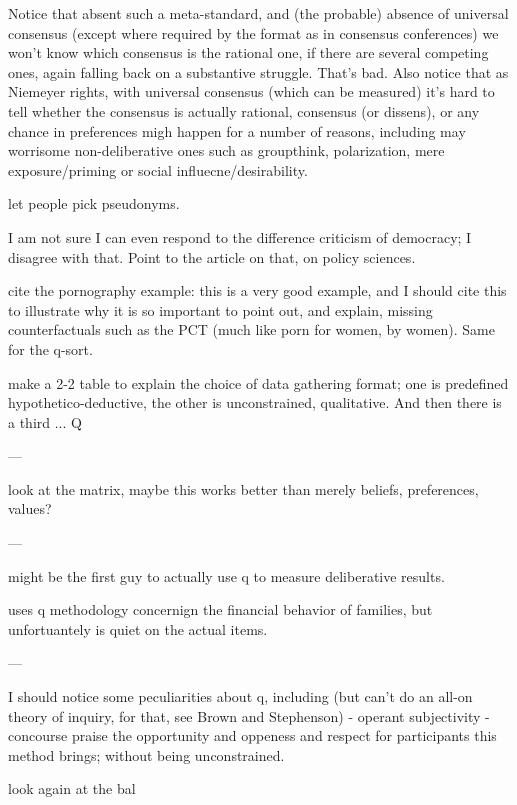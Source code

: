 Notice that absent such a meta-standard, and (the probable) absence of universal consensus (except where required by the format as in consensus conferences) we won't know which consensus is the rational one, if there are several competing ones, again falling back on a substantive struggle.
That's bad.
Also notice that as Niemeyer rights, with universal consensus (which can be measured) it's hard to tell whether the consensus is actually rational, consensus (or dissens), or any chance in preferences migh happen for a number of reasons, including may worrisome non-deliberative ones such as groupthink, polarization, mere exposure/priming or social influecne/desirability.

let people pick pseudonyms.

I am not sure I can even respond to the difference criticism of democracy; I disagree with that.
Point to the article on that, on policy sciences.

cite the pornography example: this is a very good example, and I should cite this to illustrate why it is so important to point out, and explain, missing counterfactuals such as the PCT (much like porn for women, by women).
Same for the q-sort.

make a 2-2 table to explain the choice of data gathering format; one is predefined hypothetico-deductive, the other is unconstrained, qualitative.
And then there is a third ... Q

---

\cite{Ockwell2008}

look at the \cite{Dryzek1993} matrix, maybe this works better than merely beliefs, preferences, values?

---

\cite{Pelletier1999} might be the first guy to actually use q to measure deliberative results.

\cite{price1968} uses q methodology concernign the financial behavior of families, but unfortuantely is quiet on the actual items.

---

I should notice some peculiarities about q, including (but can't do an all-on theory of inquiry, for that, see Brown and Stephenson)
- operant subjectivity
- concourse
praise the opportunity and oppeness and respect for participants this method brings; without being unconstrained.



look again at the bal
